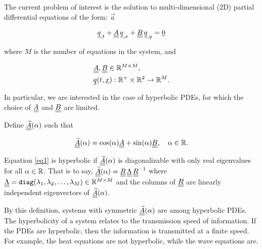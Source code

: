 
The current problem of interest is the solution to multi-dimensional (2D) partial differential equations of the form: $\vec{a}$

\begin{align}
	{\underline{q}}_{,t} + {\underline{\underline{A}}} \, {\underline{q}}_{,x} + {\underline{\underline{B}}}\, {\underline{q}}_{,y} = {\underline{0}} \label{eq1}
\end{align}

where $M$ is the number of equations in the system, and

\begin{align*}
	&{\underline{\underline{A}}}, {\underline{\underline{B}}} \in \mathbb{R}^{M \times M},\\
	&{\underline{q}}(t, {\underline{x}}) : \mathbb{R}^+ \times \mathbb{R}^2 \to \mathbb{R}^M.
\end{align*}

In particular, we are interested in the case of hyperbolic PDEs, for which the choice of ${\underline{\underline{A}}}$ and ${\underline{\underline{B}}}$ are limited.

Define ${\underline{\underline{\widetilde{A}}}}(\alpha)$ such that

\begin{align*}
	{\underline{\underline{\widetilde{A}}}}(\alpha) = \cos(\alpha){\underline{\underline{A}}} + \sin(\alpha){\underline{\underline{B}}}, \quad \alpha \in \mathbb{R}.
\end{align*}

Equation \ref{eq1} is hyperbolic if $\underline{\underline{\widetilde{A}}}(\alpha)$ is diagonalizable with only real eigenvalues for all $\alpha \in \mathbb{R}$.
That is to say, ${\underline{\underline{\widetilde{A}}}}(\alpha) = {\underline{\underline{R}}}\, {\underline{\underline{\Lambda}}}\, {\underline{\underline{R}}}^{-1}$ where ${\underline{\underline{\Lambda}}} = \texttt{diag}(\lambda_1, \lambda_2, \dots, \lambda_M) \in \mathbb{R}^{M \times M}$ and the columns of ${\underline{\underline{R}}}$ are linearly independent eigenvectors of ${\underline{\underline{\widetilde{A}}}}(\alpha)$.

By this definition, systems with symmetric ${\underline{\underline{\widetilde{A}}}}(\alpha)$ are among hyperbolic PDEs.
The hyperbolicity of a system relates to the transmission speed of information.
If the PDEs are hyperbolic, then the information is transmitted at a finite speed.
For example, the heat equations are not hyperbolic, while the wave equations are.